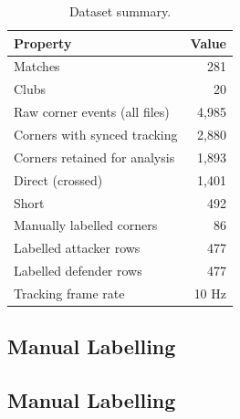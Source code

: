 \begin{table}[h]
  \centering
  \caption{Dataset summary.}
  \label{tab:dataset_overview}
  \begin{tabular}{lr}
    \toprule
    \textbf{Property} & \textbf{Value} \\
    \midrule
    Matches & 281 \\
    Clubs & 20 \\
    Raw corner events (all files) & 4,985 \\
    Corners with synced tracking & 2,880 \\
    Corners retained for analysis & 1,893 \\
    \quad Direct (crossed) & 1,401 \\
    \quad Short & 492 \\
    Manually labelled corners & 86 \\
    \quad Labelled attacker rows & 477 \\
    \quad Labelled defender rows & 477 \\
    Tracking frame rate & 10 Hz \\
    \bottomrule
  \end{tabular}
\end{table}

\subsection{Manual Labelling}
\label{sec:manual_labelling}

\subsection{Manual Labelling}
\label{sec:manual_labelling}

